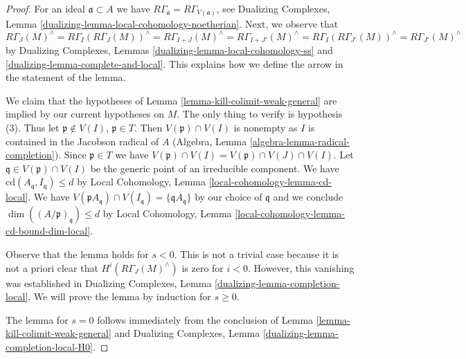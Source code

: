 \documentclass{stacks-project}
\theoremstyle{plain}
\theoremstyle{definition}
\theoremstyle{remark}
\numberwithin{equation}{subsection}
\begin{document}
\begin{proof}
For an ideal $\mathfrak a \subset A$ we have
$R\Gamma_\mathfrak a = R\Gamma_{V(\mathfrak a)}$, see
Dualizing Complexes, Lemma \ref{dualizing-lemma-local-cohomology-noetherian}.
Next, we observe that
$$
R\Gamma_J(M)^\wedge =
R\Gamma_I(R\Gamma_J(M))^\wedge =
R\Gamma_{I + J}(M)^\wedge =
R\Gamma_{I + J'}(M)^\wedge =
R\Gamma_I(R\Gamma_{J'}(M))^\wedge =
R\Gamma_{J'}(M)^\wedge
$$
by Dualizing Complexes, Lemmas \ref{dualizing-lemma-local-cohomology-ss} and
\ref{dualizing-lemma-complete-and-local}.
This explains how we define the arrow in the statement of the lemma.

\medskip\noindent
We claim that the hypotheses of Lemma \ref{lemma-kill-colimit-weak-general}
are implied by our current hypotheses on $M$.
The only thing to verify is hypothesis (3).
Thus let $\mathfrak p \not \in V(I)$, $\mathfrak p \in T$.
Then $V(\mathfrak p) \cap V(I)$ is nonempty as $I$ is
contained in the Jacobson radical of $A$
(Algebra, Lemma \ref{algebra-lemma-radical-completion}).
Since $\mathfrak p \in T$ we have
$V(\mathfrak p) \cap V(I) = V(\mathfrak p) \cap V(J) \cap V(I)$.
Let $\mathfrak q \in V(\mathfrak p) \cap V(I)$ be the
generic point of an irreducible component.
We have $\text{cd}(A_\mathfrak q, I_\mathfrak q) \leq d$
by Local Cohomology, Lemma \ref{local-cohomology-lemma-cd-local}.
We have $V(\mathfrak pA_\mathfrak q) \cap V(I_\mathfrak q) =
\{\mathfrak qA_\mathfrak q\}$ by our choice of $\mathfrak q$
and we conclude $\dim((A/\mathfrak p)_\mathfrak q) \leq d$
by Local Cohomology, Lemma \ref{local-cohomology-lemma-cd-bound-dim-local}.

\medskip\noindent
Observe that the lemma holds for $s < 0$. This is not a trivial case because
it is not a priori clear that $H^i(R\Gamma_J(M)^\wedge)$
is zero for $i < 0$. However, this vanishing was established in
Dualizing Complexes, Lemma \ref{dualizing-lemma-completion-local}.
We will prove the lemma by induction for $s \geq 0$.

\medskip\noindent
The lemma for $s = 0$ follows immediately from
the conclusion of Lemma \ref{lemma-kill-colimit-weak-general}
and Dualizing Complexes, Lemma \ref{dualizing-lemma-completion-local-H0}.


\end{proof}
\end{document}
